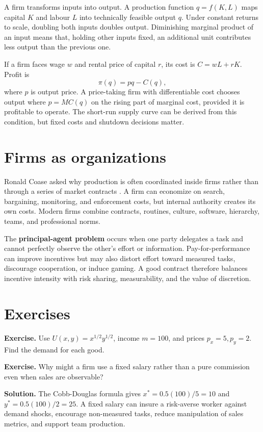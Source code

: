 \documentclass[11pt,oneside,openany]{book}
\newcommand{\term}[1]{\textbf{#1}\index{#1}}
\newcommand{\exercise}[1]{\textbf{Exercise.} #1}
\newcommand{\solution}[1]{\textbf{Solution.} #1}
\begin{document}
A firm transforms inputs into output. A production function $q=f(K,L)$ maps capital $K$ and labour $L$ into technically feasible output $q$. Under constant returns to scale, doubling both inputs doubles output. Diminishing marginal product of an input means that, holding other inputs fixed, an additional unit contributes less output than the previous one.

If a firm faces wage $w$ and rental price of capital $r$, its cost is $C=wL+rK$. Profit is
\[
  \pi(q)=p q-C(q),
\]
where $p$ is output price. A price-taking firm with differentiable cost chooses output where $p=MC(q)$ on the rising part of marginal cost, provided it is profitable to operate. The short-run supply curve can be derived from this condition, but fixed costs and shutdown decisions matter.

\section{Firms as organizations}

Ronald Coase asked why production is often coordinated inside firms rather than through a series of market contracts \cite{coase1937}. A firm can economize on search, bargaining, monitoring, and enforcement costs, but internal authority creates its own costs. Modern firms combine contracts, routines, culture, software, hierarchy, teams, and professional norms.

The \term{principal-agent problem} occurs when one party delegates a task and cannot perfectly observe the other's effort or information. Pay-for-performance can improve incentives but may also distort effort toward measured tasks, discourage cooperation, or induce gaming. A good contract therefore balances incentive intensity with risk sharing, measurability, and the value of discretion.

\section{Exercises}

\exercise{Use $U(x,y)=x^{1/2}y^{1/2}$, income $m=100$, and prices $p_x=5,p_y=2$. Find the demand for each good.}

\exercise{Why might a firm use a fixed salary rather than a pure commission even when sales are observable?}

\solution{The Cobb-Douglas formula gives $x^*=0.5(100)/5=10$ and $y^*=0.5(100)/2=25$. A fixed salary can insure a risk-averse worker against demand shocks, encourage non-measured tasks, reduce manipulation of sales metrics, and support team production.}
\end{document}
